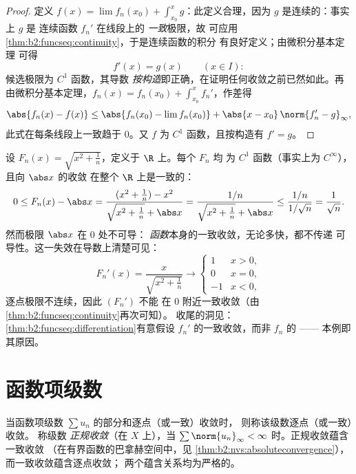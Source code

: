 \begin{proof}
定义 $f(x) = \lim f_n(x_0) + \int_{x_0}^x g$：此定义合理，因为 $g$
是连续的：事实上 $g$ 是
连续函数 $f_n'$ 在线段上的 \emph{一致}极限，故
可应用\cref{thm:b2:funcseq:continuity}，于是连续函数的积分
有良好定义；由微积分基本定理
可得
\[
f'(x) = g(x) \qquad (x \in I) :
\]
候选极限为 $C^1$ 函数，其导数
\emph{按构造}即正确，在证明任何收敛之前已然如此。再
由微积分基本定理，$f_n(x) = f_n(x_0) + \int_{x_0}^x
f_n'$，作差得
\[
\abs{f_n(x) - f(x)} \leq \abs{f_n(x_0) - \lim f_n(x_0)}
+ \abs{x - x_0}\,\norm{f_n' - g}_{\infty} ,
\]
此式在每条线段上一致趋于 $0$。又 $f$ 为 $C^1$
函数，且按构造有 $f' = g$。
\end{proof}

\begin{example}[为何假设加在导数上]\label{ex:b2:funcseq:sqrtabs}
设 $F_n(x) = \sqrt{x^2 + \frac1n}$，定义于 $\R$ 上。每个 $F_n$ 均
为 $C^1$ 函数（事实上为 $C^\infty$），且向 $\abs x$ 的收敛
在整个 $\R$ 上是一致的：
\[
0 \leq F_n(x) - \abs x
= \frac{(x^2 + \frac1n) - x^2}{\sqrt{x^2+\frac1n} + \abs x}
= \frac{1/n}{\sqrt{x^2 + \frac1n} + \abs x}
\leq \frac{1/n}{1/\sqrt n} = \frac{1}{\sqrt n} .
\]
然而极限 $\abs x$ 在 $0$ 处不可导：
\emph{函数}本身的一致收敛，无论多快，都不传递
可导性。这一失效在导数上清楚可见：
\[
F_n'(x) = \frac{x}{\sqrt{x^2 + \frac1n}}
\longrightarrow \begin{cases} 1 & x > 0,\\ 0 & x = 0,\\
-1 & x < 0, \end{cases}
\]
逐点极限不连续，因此 $(F_n')$ 不能
在 $0$ 附近一致收敛（由\cref{thm:b2:funcseq:continuity}再次可知）。
收尾的洞见：
\cref{thm:b2:funcseq:differentiation}有意假设
$f_n'$ 的一致收敛，而非 $f_n$ 的 ——
本例即其原因。
\end{example}

\section{函数项级数}

\begin{definition}\label{def:b2:funcseq:series}
当函数项级数 $\sum u_n$ 的部分和逐点（或一致）收敛时，
则称该级数逐点（或一致）收敛。
称级数 \emph{正规收敛}（在 $X$ 上），当 $\sum
\norm{u_n}_\infty < \infty$ 时。正规收敛蕴含一致收敛
（在有界函数的巴拿赫空间中，见
\cref{thm:b2:nvs:absoluteconvergence}），而一致收敛蕴含逐点收敛；
两个蕴含关系均为严格的。
\end{definition}

